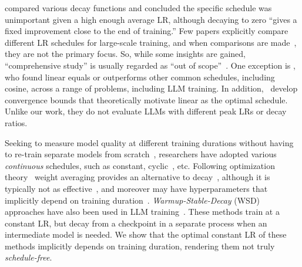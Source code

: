\citet{kaplan2020scaling} compared various decay functions and
concluded the specific schedule was unimportant given a high enough
average LR, although decaying to zero ``gives a fixed improvement
close to the end of training.''
%
Few papers explicitly compare different LR schedules for large-scale
training, and when comparisons are
made~\citep{shallue2019measuring,kaplan2020scaling,schmidt2021descending,hoffmann2022empirical,yang2022mup},
they are not the primary focus.  So, while some insights are gained,
``comprehensive study'' is usually regarded as ``out of
scope''~\citep{alephalpha2024introducing}.
%
One exception is \citet{defazio2023when}, who found linear equals or
outperforms other common schedules, including cosine, across a range
of problems, including LLM training.  In addition,
\citeauthor{defazio2023when}\ develop convergence bounds that
theoretically motivate linear as the optimal schedule.  Unlike our
work, they do not evaluate LLMs with different peak LRs or decay
ratios.

Seeking to measure model quality at different training durations
without having to re-train separate models from
scratch~\citep{zhai2022scaling,hagele2024scaling}, researchers have
adopted various \emph{continuous} schedules, such as constant,
cyclic~\citep{smith2017cyclical}, etc.
%
Following optimization theory~\citep{moulines2011non,defazio2024road}
weight averaging provides an alternative to
decay~\citep{sandler2023training,sanyal2023early,busbridge2024scale},
although it is typically not as effective~\citep{hagele2024scaling},
and moreover may have hyperparameters that implicitly depend on
training duration~\citep{defazio2024road}.
%
\emph{Warmup-Stable-Decay} (WSD) approaches have also been used in LLM
training~\citep{hu2024minicpm,shen2024jetmoe,ibrahim2024simple,hagele2024scaling}.
These methods train at a constant LR, but decay from a checkpoint in a
separate process when an intermediate model is needed.
%
We show that the optimal constant LR of these methods implicitly
depends on training duration, rendering them not truly
\emph{schedule-free}.

